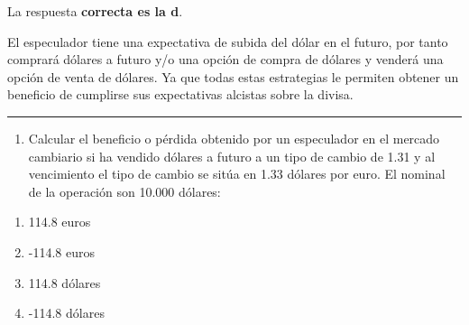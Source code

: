 \documentclass[
  letterpaper,
  DIV=11,
  numbers=noendperiod]{scrreprt}
\providecommand{\tightlist}{%
  \setlength{\itemsep}{0pt}\setlength{\parskip}{0pt}}\usepackage{longtable,booktabs,array}
\begin{document}
\begin{tcolorbox}[enhanced jigsaw, left=2mm, opacityback=0, colback=white, breakable, arc=.35mm, bottomrule=.15mm, rightrule=.15mm, toprule=.15mm, leftrule=.75mm, colframe=quarto-callout-tip-color-frame]
\begin{minipage}[t]{5.5mm}
\textcolor{quarto-callout-tip-color}{\faLightbulb}
\end{minipage}%
\begin{minipage}[t]{\textwidth - 5.5mm}

La respuesta \textbf{correcta es la d}.

El especulador tiene una expectativa de subida del dólar en el futuro,
por tanto comprará dólares a futuro y/o una opción de compra de dólares
y venderá una opción de venta de dólares. Ya que todas estas estrategias
le permiten obtener un beneficio de cumplirse sus expectativas alcistas
sobre la divisa.

\end{minipage}%
\end{tcolorbox}

\begin{center}\rule{0.5\linewidth}{0.5pt}\end{center}

\begin{enumerate}
\def\labelenumi{\arabic{enumi}.}
\setcounter{enumi}{9}
\tightlist
\item
  Calcular el beneficio o pérdida obtenido por un especulador en el
  mercado cambiario si ha vendido dólares a futuro a un tipo de cambio
  de 1.31 y al vencimiento el tipo de cambio se sitúa en 1.33 dólares
  por euro. El nominal de la operación son 10.000 dólares:
\end{enumerate}

\begin{enumerate}
\def\labelenumi{\alph{enumi})}
\item
  114.8 euros
\item
  -114.8 euros
\item
  114.8 dólares
\item
  -114.8 dólares
\end{enumerate}
\end{document}
